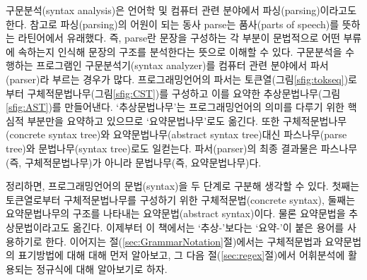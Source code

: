 %
%
구문분석(syntax analysis)은 언어학 및 컴퓨터 관련 분야에서
파싱(parsing)이라고도 한다. 참고로 파싱(parsing)의 어원이 되는 동사
parse는 품사(parts of speech)를 뜻하는 라틴어에서 유래했다\cite{MWdict}.
즉, parse란 문장을 구성하는 각 부분이 문법적으로 어떤 부류에
속하는지 인식해 문장의 구조를 분석한다는 뜻으로 이해할 수 있다.
구문분석을 수행하는 프로그램인 구문분석기(syntax analyzer)를
컴퓨터 관련 분야에서
%
%
파서(parser)라 부르는 경우가 많다.
프로그래밍언어의 파서는 토큰열(그림\;\ref{sfig:tokseq})로부터
%
%
구체적문법나무(그림\;\ref{sfig:CST})를 구성하고 이를 요약한
%
%
추상문법나무(그림\;\ref{sfig:AST})를 만들어낸다. `추상문법나무'는
프로그래밍언어의 의미를 다루기 위한 핵심적 부분만을 요약하고 있으므로
%
%
%
%
%
`요약문법나무'로도 옮긴다. 또한 구체적문법나무(concrete syntax tree)와
요약문법나무(abstract syntax tree)대신 파스나무(parse tree)와
문법나무(syntax tree)로도 일컫는다. 파서(parser)의 최종 결과물은
파스나무(즉, 구체적문법나무)가 아니라 문법나무(즉, 요약문법나무)다.

정리하면, 프로그래밍언어의 문법(syntax)을 두 단계로 구분해 생각할 수 있다.
첫째는 토큰열로부터 구체적문법나무를 구성하기 위한
%
%
%
%
구체적문법(concrete syntax), 둘째는 요약문법나무의 구조를
나타내는
%
%
%
%
%
%
요약문법(abstract syntax)이다. 물론 요약문법을
추상문법이라고도 옮긴다. 이제부터 이 책에서는 `추상-'보다는 `요약-'이 붙은
용어를 사용하기로 한다. 이어지는 절(\ref{sec:GrammarNotation}절)에서는
구체적문법과 요약문법의 표기방법에 대해 대해 먼저 알아보고,
그 다음 절(\ref{sec:regex}절)에서 어휘분석에 활용되는 정규식에
대해 알아보기로 하자.

